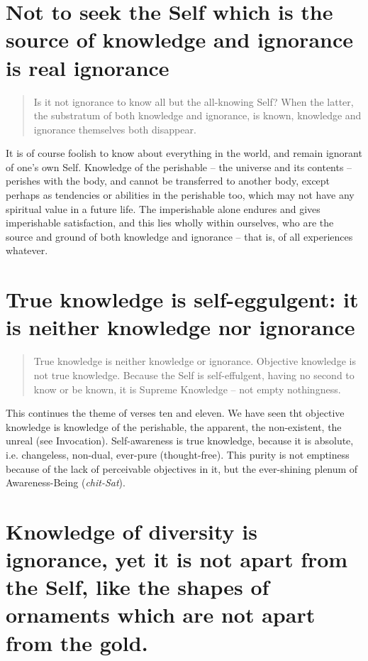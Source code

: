 \documentclass[12pt]{report}
\begin{document}
\section{ Not to seek the Self which is the source of knowledge and
ignorance is real ignorance}

\begin{quote}
  Is it not ignorance to know all but the all-knowing Self? When the
  latter, the substratum of both knowledge and ignorance, is known,
  knowledge and ignorance themselves both disappear.
\end{quote}


It is of course foolish to know about everything in the world, and
remain ignorant of one's own Self. Knowledge of the perishable -- the
universe and its contents -- perishes with the body, and cannot be
transferred to another body, except perhaps as tendencies or abilities
in the perishable too, which may not have any spiritual value in a
future life. The imperishable alone endures and gives imperishable
satisfaction, and this lies wholly within ourselves, who are the
source and ground of both knowledge and ignorance -- that is, of all
experiences whatever.

\section{ True knowledge is self-eggulgent: it is neither knowledge
nor ignorance}

\begin{quote}
  True knowledge is neither knowledge or ignorance. Objective knowledge
  is not true knowledge. Because the Self is self-effulgent, having no
  second to know or be known, it is Supreme Knowledge -- not empty
  nothingness.
\end{quote}


This continues the theme of verses ten and eleven. We have seen tht
objective knowledge is knowledge of the perishable, the apparent, the
non-existent, the unreal (see Invocation). Self-awareness is true
knowledge, because it is absolute, i.e. changeless, non-dual,
ever-pure (thought-free). This purity is not emptiness because of the
lack of perceivable objectives in it, but the ever-shining plenum of
Awareness-Being (\emph{chit-Sat}).

\section{ Knowledge of diversity is ignorance, yet it is not apart
  from the Self, like the shapes of ornaments which are not apart from
the gold.}
\end{document}
